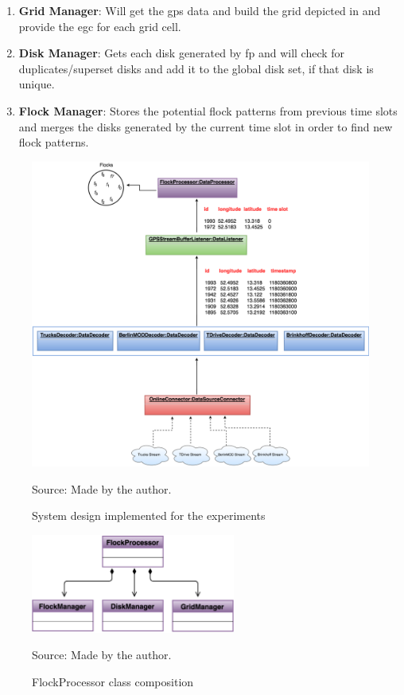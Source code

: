 {\begin{enumerate}
    \item \textbf{Grid Manager}: Will get the \ac{gps} data and build the grid depicted in  and provide
        the \ac{egc} for each grid cell.
    \item \textbf{Disk Manager}: Gets each disk generated by \ac{fp} and will check for duplicates/superset disks and
        add it to the global disk set, if that disk is unique.
    \item \textbf{Flock Manager}: Stores the potential flock patterns from previous time slots and merges the disks
        generated by the current time slot in order to find new flock patterns.
\end{enumerate}

\begin{figure}[h!]
    \centering
    \caption{System design implemented for the experiments}
    \centerline{\includegraphics[width=\textwidth]{images/experimental_arch.eps}}
    \footnotesize{Source: Made by the author.}
    \label{fig:experimental_arch}
\end{figure}

\begin{figure}[h!]
    \centering
    \caption{FlockProcessor class composition}
    \centerline{\includegraphics[width=0.6\textwidth]{images/flock_processor_details.eps}}
    \footnotesize{Source: Made by the author.}
    \label{fig:flock_processor_details}
\end{figure}

}
